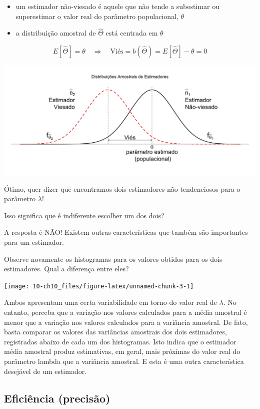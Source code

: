 \documentclass[
]{book}
\theoremstyle{definition}
\theoremstyle{definition}
\theoremstyle{definition}
\theoremstyle{remark}
\begin{document}
\begin{itemize}
\item
  um estimador não-viesado é aquele que não tende a subestimar ou superestimar o valor real do parâmetro populacional, \(\theta\)
\item
  a distribuição amostral de \(\hat\Theta\) está centrada em \(\theta\)
\end{itemize}

\[E[\hat\Theta] = \theta \quad \Longrightarrow \quad \text{Viés} = b(\hat\Theta) = E[\hat\Theta] - \theta = 0\]

\includegraphics[width=1\linewidth]{img/biased-estimator}

Ótimo, quer dizer que encontramos dois estimadores não-tendenciosos para o parâmetro \(\lambda\)!

Isso significa que é indiferente escolher um dos dois?

A resposta é NÃO! Existem outras características que também são importantes para um estimador.

Observe novamente os histogramas para os valores obtidos para os dois
estimadores. Qual a diferença entre eles?

\texttt{[image: 10-ch10\_files/figure-latex/unnamed-chunk-3-1]}

Ambos apresentam uma certa variabilidade em torno do valor real de \(\lambda\). No entanto, perceba que a variação nos valores calculados para a média amostral é menor que a variação nos valores calculados para a variância amostral. De fato, basta comparar os valores das variâncias amostrais dos dois estimadores, registradas abaixo de cada um dos histogramas. Isto indica que o estimador média amostral produz estimativas, em geral, mais próximas do valor real do parâmetro lambda que a variância amostral. E esta é uma outra característica desejável de um estimador.

\hypertarget{eficiuxeancia-precisuxe3o}{%
\subsection*{Eficiência (precisão)}\label{eficiuxeancia-precisuxe3o}}
\end{document}
